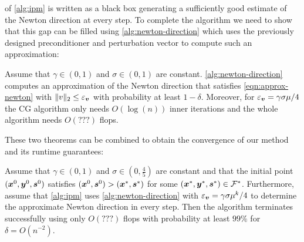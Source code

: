  of \cref{alg:ipm} is written as a black box generating a sufficiently good estimate of the Newton direction at every step.
To complete the algorithm we need to show that this gap can be filled using \cref{alg:newton-direction} which uses the previously designed preconditioner and perturbation vector to compute such an approximation:
\begin{theorem}
Assume that \(\gamma \in (0, 1)\) and \(\sigma \in (0, 1)\) are constant. \cref{alg:newton-direction} computes an approximation of the Newton direction that satisfies \cref{eqn:approx-newton} with \(\lVert v \rVert_2 \leq \varepsilon_{\bm{v}}\) with probability at least \(1 - \delta\).
Moreover, for \(\varepsilon_{\bm{v}} = \gamma \sigma \mu / 4\) the CG algorithm only needs \(O(\log(n))\) inner iterations and the whole algorithm needs \(O(???)\) flops.
\end{theorem}

These two theorems can be combined to obtain the convergence of our method and its runtime guarantees:
\begin{theorem}
Assume that \(\gamma \in (0, 1)\) and \(\sigma \in (0, \frac{4}{5})\) are constant and that the initial point \((\bm{x}^0, \bm{y}^0, \bm{s}^0)\) satisfies \((\bm{x}^0, \bm{s}^0) > (\bm{x}^*, \bm{s}^*)\) for some \((\bm{x}^*, \bm{y}^*, \bm{s}^*) \in \mathcal{F}^*\).
Furthermore, assume that \cref{alg:ipm} uses \cref{alg:newton-direction} with \(\varepsilon_{\bm{v}} = \gamma \sigma \mu^k / 4\) to determine the approximate Newton direction in every step.
Then the algorithm terminates successfully using only \(O(???)\) flops with probability at least \(99\%\) for \(\delta = O(n^{-2})\).
\end{theorem}